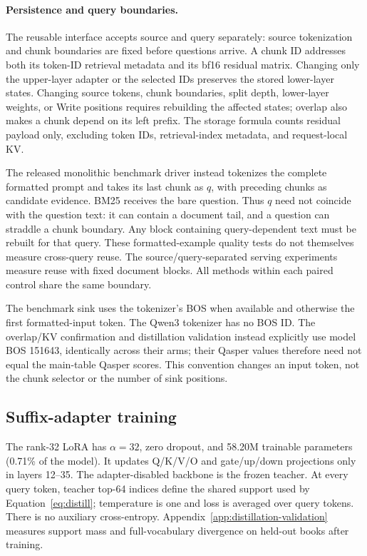 \paragraph{Persistence and query boundaries.}
\label{app:query-boundary}
The reusable interface accepts source and query separately: source tokenization and chunk boundaries are fixed before questions arrive. A chunk ID addresses both its token-ID retrieval metadata and its bf16 residual matrix. Changing only the upper-layer adapter or the selected IDs preserves the stored lower-layer states. Changing source tokens, chunk boundaries, split depth, lower-layer weights, or Write positions requires rebuilding the affected states; overlap also makes a chunk depend on its left prefix. The storage formula counts residual payload only, excluding token IDs, retrieval-index metadata, and request-local KV.

The released monolithic benchmark driver instead tokenizes the complete formatted prompt and takes its last chunk as $q$, with preceding chunks as candidate evidence. BM25 receives the bare question. Thus $q$ need not coincide with the question text: it can contain a document tail, and a question can straddle a chunk boundary. Any block containing query-dependent text must be rebuilt for that query. These formatted-example quality tests do not themselves measure cross-query reuse. The source/query-separated serving experiments measure reuse with fixed document blocks. All methods within each paired control share the same boundary.

The benchmark sink uses the tokenizer's BOS when available and otherwise the first formatted-input token. The Qwen3 tokenizer has no BOS ID. The overlap/KV confirmation and distillation validation instead explicitly use model BOS 151643, identically across their arms; their Qasper values therefore need not equal the main-table Qasper scores. This convention changes an input token, not the chunk selector or the number of sink positions.

\subsection{Suffix-adapter training}
The rank-32 LoRA has $\alpha=32$, zero dropout, and 58.20M trainable parameters (0.71\% of the model). It updates Q/K/V/O and gate/up/down projections only in layers 12--35. The adapter-disabled backbone is the frozen teacher. At every query token, teacher top-64 indices define the shared support used by Equation~\ref{eq:distill}; temperature is one and loss is averaged over query tokens. There is no auxiliary cross-entropy. Appendix~\ref{app:distillation-validation} measures support mass and full-vocabulary divergence on held-out books after training.

